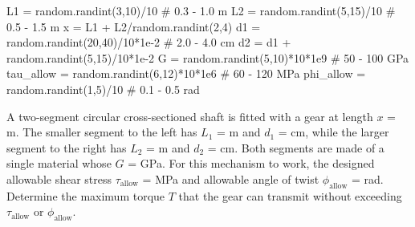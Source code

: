 \documentclass[
10pt,
a4paper,
openany,
svgnames,
]{kaobook} %
\begin{document}
\begin{exercises}
  \begin{figure}[H]
    \centering
  \end{figure}

\begin{pycode}
L1 = random.randint(3,10)/10 # 0.3 - 1.0 m
L2 = random.randint(5,15)/10 # 0.5 - 1.5 m
x = L1 + L2/random.randint(2,4)
d1 = random.randint(20,40)/10*1e-2 # 2.0 - 4.0 cm
d2 = d1 + random.randint(5,15)/10*1e-2
G = random.randint(5,10)*10*1e9 # 50 - 100 GPa
tau_allow = random.randint(6,12)*10*1e6 # 60 - 120 MPa
phi_allow = random.randint(1,5)/10 # 0.1 - 0.5 rad
\end{pycode}

  \item A two-segment circular cross-sectioned shaft is fitted with a gear at length $x$ =  m. The smaller segment to the left has $L_{1}$ =  m and $d_{1}$ =  cm, while the larger segment to the right has $L_{2}$ =  m and $d_{2}$ =  cm. Both segments are made of a single material whose $G$ =  GPa. For this mechanism to work, the designed allowable shear stress $\tau_{\text{allow}}$ =  MPa and allowable angle of twist $\phi_{\text{allow}}$ =  rad. Determine the maximum torque $T$ that the gear can transmit without exceeding $\tau_{\text{allow}}$ or $\phi_{\text{allow}}$.


\end{exercises}
\end{document}
